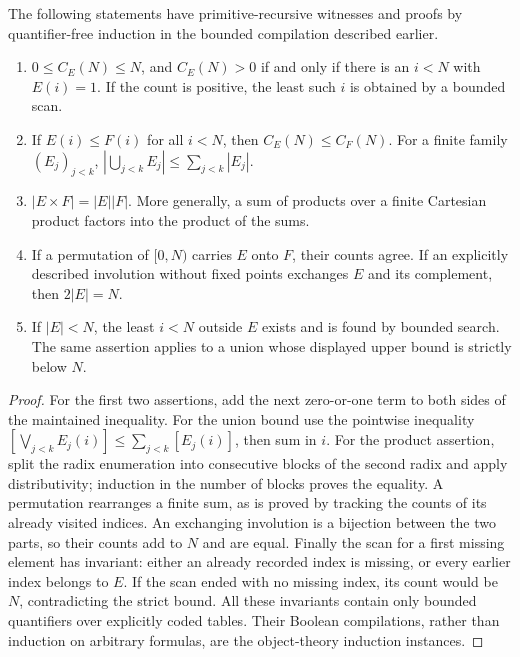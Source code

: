 \begin{lemma}\label{thm:R01}
The following statements have primitive-recursive witnesses and proofs by
quantifier-free induction in the bounded compilation described earlier.
\begin{enumerate}
\item $0\leq C_E(N)\leq N$, and $C_E(N)>0$ if and only if there is an
      $i<N$ with $E(i)=1$. If the count is positive, the least such $i$ is
      obtained by a bounded scan.
\item If $E(i)\leq F(i)$ for all $i<N$, then $C_E(N)\leq C_F(N)$.
      For a finite family $(E_j)_{j<k}$,
      $|\bigcup_{j<k}E_j|\leq\sum_{j<k}|E_j|$.
\item $|E\times F|=|E||F|$. More generally, a sum of products over a
      finite Cartesian product factors into the product of the sums.
\item If a permutation of $[0,N)$ carries $E$ onto $F$, their counts agree.
      If an explicitly described involution without fixed points exchanges
      $E$ and its complement, then $2|E|=N$.
\item If $|E|<N$, the least $i<N$ outside $E$ exists and is found by bounded
      search. The same assertion applies to a union whose displayed upper
      bound is strictly below $N$.
\end{enumerate}
\end{lemma}
\begin{proof}
For the first two assertions, add the next zero-or-one term to both sides
of the maintained inequality. For the union bound use the pointwise
inequality $[\bigvee_{j<k}E_j(i)]\leq\sum_{j<k}[E_j(i)]$, then sum in $i$.
For the product assertion, split the radix enumeration into consecutive
blocks of the second radix and apply distributivity; induction in the
number of blocks proves the equality. A permutation rearranges a finite
sum, as is proved by tracking the counts of its already visited indices.
An exchanging involution is a bijection between the two parts, so their
counts add to $N$ and are equal. Finally the scan for a first missing
element has invariant: either an already recorded index is missing, or
every earlier index belongs to $E$. If the scan ended with no missing
index, its count would be $N$, contradicting the strict bound. All these
invariants contain only bounded quantifiers over explicitly coded tables.
Their Boolean compilations, rather than induction on arbitrary formulas,
are the object-theory induction instances.
\end{proof}

